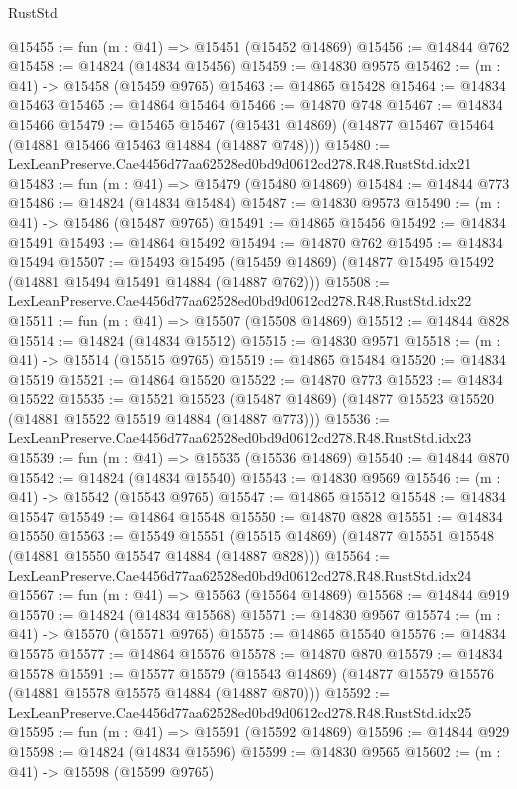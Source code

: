 \begin{lexlean}{RustStd}
\begin{coremodule}
@15455 := fun (m : @41) => @15451 (@15452 @14869)
@15456 := @14844 @762
@15458 := @14824 (@14834 @15456)
@15459 := @14830 @9575
@15462 := (m : @41) -> @15458 (@15459 @9765)
@15463 := @14865 @15428
@15464 := @14834 @15463
@15465 := @14864 @15464
@15466 := @14870 @748
@15467 := @14834 @15466
@15479 := @15465
    @15467
    (@15431 @14869)
    (@14877 @15467 @15464 (@14881 @15466 @15463 @14884 (@14887 @748)))
@15480 := LexLeanPreserve.Cae4456d77aa62528ed0bd9d0612cd278.R48.RustStd.idx21
@15483 := fun (m : @41) => @15479 (@15480 @14869)
@15484 := @14844 @773
@15486 := @14824 (@14834 @15484)
@15487 := @14830 @9573
@15490 := (m : @41) -> @15486 (@15487 @9765)
@15491 := @14865 @15456
@15492 := @14834 @15491
@15493 := @14864 @15492
@15494 := @14870 @762
@15495 := @14834 @15494
@15507 := @15493
    @15495
    (@15459 @14869)
    (@14877 @15495 @15492 (@14881 @15494 @15491 @14884 (@14887 @762)))
@15508 := LexLeanPreserve.Cae4456d77aa62528ed0bd9d0612cd278.R48.RustStd.idx22
@15511 := fun (m : @41) => @15507 (@15508 @14869)
@15512 := @14844 @828
@15514 := @14824 (@14834 @15512)
@15515 := @14830 @9571
@15518 := (m : @41) -> @15514 (@15515 @9765)
@15519 := @14865 @15484
@15520 := @14834 @15519
@15521 := @14864 @15520
@15522 := @14870 @773
@15523 := @14834 @15522
@15535 := @15521
    @15523
    (@15487 @14869)
    (@14877 @15523 @15520 (@14881 @15522 @15519 @14884 (@14887 @773)))
@15536 := LexLeanPreserve.Cae4456d77aa62528ed0bd9d0612cd278.R48.RustStd.idx23
@15539 := fun (m : @41) => @15535 (@15536 @14869)
@15540 := @14844 @870
@15542 := @14824 (@14834 @15540)
@15543 := @14830 @9569
@15546 := (m : @41) -> @15542 (@15543 @9765)
@15547 := @14865 @15512
@15548 := @14834 @15547
@15549 := @14864 @15548
@15550 := @14870 @828
@15551 := @14834 @15550
@15563 := @15549
    @15551
    (@15515 @14869)
    (@14877 @15551 @15548 (@14881 @15550 @15547 @14884 (@14887 @828)))
@15564 := LexLeanPreserve.Cae4456d77aa62528ed0bd9d0612cd278.R48.RustStd.idx24
@15567 := fun (m : @41) => @15563 (@15564 @14869)
@15568 := @14844 @919
@15570 := @14824 (@14834 @15568)
@15571 := @14830 @9567
@15574 := (m : @41) -> @15570 (@15571 @9765)
@15575 := @14865 @15540
@15576 := @14834 @15575
@15577 := @14864 @15576
@15578 := @14870 @870
@15579 := @14834 @15578
@15591 := @15577
    @15579
    (@15543 @14869)
    (@14877 @15579 @15576 (@14881 @15578 @15575 @14884 (@14887 @870)))
@15592 := LexLeanPreserve.Cae4456d77aa62528ed0bd9d0612cd278.R48.RustStd.idx25
@15595 := fun (m : @41) => @15591 (@15592 @14869)
@15596 := @14844 @929
@15598 := @14824 (@14834 @15596)
@15599 := @14830 @9565
@15602 := (m : @41) -> @15598 (@15599 @9765)

\end{coremodule}
\end{lexlean}
